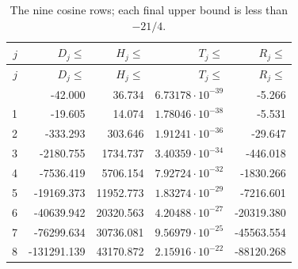 {\small
\setlength{\tabcolsep}{3pt}
\begin{longtable}{rrrrr}
\caption{The nine cosine rows; each final upper bound is less than $-21/4$.}\label{tab:single-complete}\\
\toprule $j$ & $D_j\le$ & $H_j\le$ & $T_j\le$ & $R_j\le$\\ \midrule
\endfirsthead
\toprule $j$ & $D_j\le$ & $H_j\le$ & $T_j\le$ & $R_j\le$\\ \midrule
\endhead
\bottomrule\endfoot
0 & -42.000 & 36.734 & $6.73178\cdot10^{-39}$ & -5.266\\
1 & -19.605 & 14.074 & $1.78046\cdot10^{-38}$ & -5.531\\
2 & -333.293 & 303.646 & $1.91241\cdot10^{-36}$ & -29.647\\
3 & -2180.755 & 1734.737 & $3.40359\cdot10^{-34}$ & -446.018\\
4 & -7536.419 & 5706.154 & $7.92724\cdot10^{-32}$ & -1830.266\\
5 & -19169.373 & 11952.773 & $1.83274\cdot10^{-29}$ & -7216.601\\
6 & -40639.942 & 20320.563 & $4.20488\cdot10^{-27}$ & -20319.380\\
7 & -76299.634 & 30736.081 & $9.56979\cdot10^{-25}$ & -45563.554\\
8 & -131291.139 & 43170.872 & $2.15916\cdot10^{-22}$ & -88120.268\\
\end{longtable}
}

